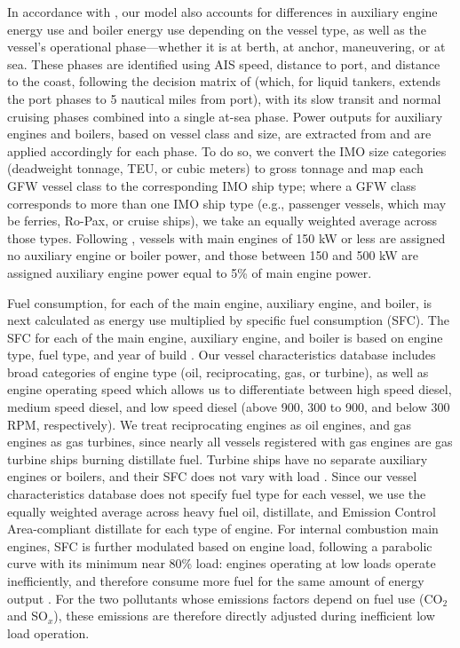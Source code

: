 \documentclass[lineno,pdflatex,sn-nature]{sn-jnl}
\begin{document}
In accordance with \cite{fourth2020greenhouse}, our model also accounts for differences in auxiliary engine energy use and boiler energy use depending on the vessel type, as well as the vessel’s operational phase—whether it is at berth, at anchor, maneuvering, or at sea. These phases are identified using AIS speed, distance to port, and distance to the coast, following the decision matrix of \cite{fourth2020greenhouse} (which, for liquid tankers, extends the port phases to 5 nautical miles from port), with its slow transit and normal cruising phases combined into a single at-sea phase. Power outputs for auxiliary engines and boilers, based on vessel class and size, are extracted from \cite{fourth2020greenhouse} and are applied accordingly for each phase. To do so, we convert the IMO size categories (deadweight tonnage, TEU, or cubic meters) to gross tonnage and map each GFW vessel class to the corresponding IMO ship type; where a GFW class corresponds to more than one IMO ship type (e.g., passenger vessels, which may be ferries, Ro-Pax, or cruise ships), we take an equally weighted average across those types. Following \cite{fourth2020greenhouse}, vessels with main engines of 150 kW or less are assigned no auxiliary engine or boiler power, and those between 150 and 500 kW are assigned auxiliary engine power equal to 5\% of main engine power.


Fuel consumption, for each of the main engine, auxiliary engine, and boiler, is next calculated as energy use multiplied by specific fuel consumption (SFC). The SFC for each of the main engine, auxiliary engine, and boiler is based on engine type, fuel type, and year of build  \cite{fourth2020greenhouse}. Our vessel characteristics database includes broad categories of engine type (oil, reciprocating, gas, or turbine), as well as engine operating speed which allows us to differentiate between high speed diesel, medium speed diesel, and low speed diesel (above 900, 300 to 900, and below 300 RPM, respectively). We treat reciprocating engines as oil engines, and gas engines as gas turbines, since nearly all vessels registered with gas engines are gas turbine ships burning distillate fuel. Turbine ships have no separate auxiliary engines or boilers, and their SFC does not vary with load \cite{olmer2017greenhouse, fourth2020greenhouse}. Since our vessel characteristics database does not specify fuel type for each vessel, we use the equally weighted average across heavy fuel oil, distillate, and Emission Control Area-compliant distillate for each type of engine. For internal combustion main engines, SFC is further modulated based on engine load, following a parabolic curve with its minimum near 80\% load: engines operating at low loads operate inefficiently, and therefore consume more fuel for the same amount of energy output  \cite{olmer2017greenhouse, fourth2020greenhouse}. For the two pollutants whose emissions factors depend on fuel use (CO$_{2}$ and SO$_{x}$), these emissions are therefore directly adjusted during inefficient low load operation.
\end{document}
